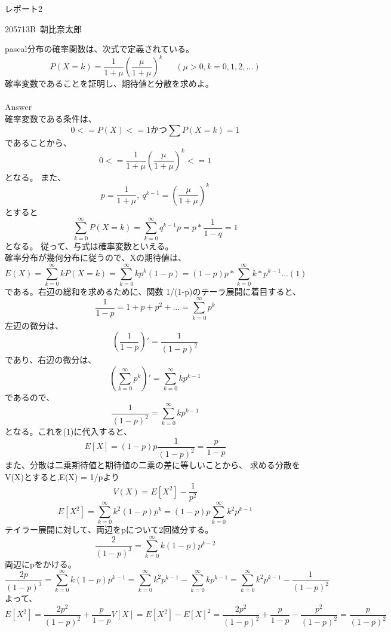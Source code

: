 \documentclass[11pt]{jsarticle}
\begin{document}
レポート2\\
\begin{flushright}
  205713B\ 朝比奈太郎
\end{flushright}

pascal分布の確率関数は、次式で定義されている。\\
\[
P(X = k) = \frac{1}{1+\mu}(\frac{\mu}{1+\mu})^k \ \ \ \ \ \ \
(\mu > 0, k = 0,1,2, ...)
\]
確率変数であることを証明し、期待値と分散を求めよ。\\
\\
Answer\\
確率変数である条件は、 
\[
0 <= P(X) <= 1 かつ　\sum P(X = k) = 1
\]
であることから、
\[
0 <= \frac{1}{1+\mu}(\frac{\mu}{1+\mu})^k <= 1
\]
となる。
また、
\[
p = \frac{1}{1+\mu}, \ q^{k-1} = (\frac{\mu}{1+\mu})^k
\]とすると
\[
\sum _{k=0}^{\infty} P(X = k) = \sum _{k=0}^{\infty} q^{k-1} p = p * \frac{1}{1-q} = 1
\]となる。
従って、与式は確率変数といえる。\\

確率分布が幾何分布に従うので、Xの期待値は、
\[
E(X) = \sum _{k=0}^{\infty}kP(X = k) = \sum _{k=0}^{\infty}kp^{k}(1-p) = (1-p)p* \sum _{k=0}^{\infty} k*p^{k-1} ...(1)
\]
である。右辺の総和を求めるために、関数 1/(1-p)のテーラ展開に着目すると、
\[
\frac{1}{1-p} = 1+p+p^2+... = \sum _{k=0}^{\infty}p^k
\]
左辺の微分は、
\[
(\frac{1}{1-p})' = \frac{1}{(1-p)^2}
\]
であり、右辺の微分は、
\[
(\sum _{k=0}^{\infty}p^k)' = \sum _{k=0}^{\infty}kp^{k-1}
\]
であるので、
\[
\frac{1}{(1-p)^2} = \sum _{k=0}^{\infty}kp^{k-1}
\]
となる。これを(1)に代入すると、
\[
E[X] = (1-p)p \frac{1}{(1-p)^2} = \frac{p}{1-p}
\]
また、分散は二乗期待値と期待値の二乗の差に等しいことから、
求める分散をV(X)とすると,E(X) = 1/pより
\[
V(X) = E[X^2] - \frac{1}{p^2}
\]
\[
E[X^2] =  \sum _{k=0}^{\infty}k^2(1-p)p^k =  (1-p)p\sum _{k=0}^{\infty}k^2p^{k-1}
\]
テイラー展開に対して、両辺をpについて2回微分する。
\[
\frac{2}{(1-p)^3} = \sum _{k=0}^{\infty}k(1-p)p^{k-2}
\]
両辺にpをかける。
\[
\frac{2p}{(1-p)^3} = \sum _{k=0}^{\infty}k(1-p)p^{k-1} =  \sum _{k=0}^{\infty}k^2p^{k-1} -  \sum _{k=0}^{\infty}kp^{k-1} =  \sum _{k=0}^{\infty}k^2p^{k-1} - \frac{1}{(1-p)^2}
\]
よって、
\[
E[X^2] = \frac{2p^2}{(1-p)^2} + \frac{p}{1-p}
V[X] = E[X^2] - E[X]^2 = \frac{2p^2}{(1-p)^2} + \frac{p}{1-p} - \frac{p^2}{(1-p)^2} = \frac{p}{(1-p)^2}
\]
\end{document}
